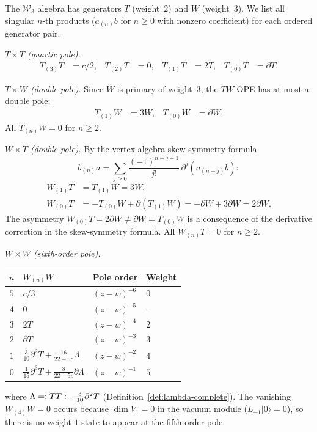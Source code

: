 \begin{computation}\label{comp:w3-nthproducts}
The $\mathcal{W}_3$ algebra has generators $T$ (weight~$2$) and $W$ (weight~$3$).
We list all singular $n$-th products ($a_{(n)}b$ for $n \geq 0$ with nonzero coefficient)
for each ordered generator pair.

\emph{$T \times T$ (quartic pole).}
\begin{align*}
T_{(3)}T &= c/2, & T_{(2)}T &= 0, &
T_{(1)}T &= 2T, & T_{(0)}T &= \partial T.
\end{align*}

\emph{$T \times W$ (double pole).}
Since $W$ is primary of weight~$3$, the $TW$ OPE has at most a double pole:
\begin{align*}
T_{(1)}W &= 3W, & T_{(0)}W &= \partial W.
\end{align*}
All $T_{(n)}W = 0$ for $n \geq 2$.

\emph{$W \times T$ (double pole).}
By the vertex algebra skew-symmetry formula
\[
b_{(n)}a = \sum_{j \geq 0}
\frac{(-1)^{n+j+1}}{j!}\,\partial^j(a_{(n+j)}b)\colon
\]
\begin{align*}
W_{(1)}T &= T_{(1)}W = 3W, \\
W_{(0)}T &= -T_{(0)}W + \partial(T_{(1)}W) = -\partial W + 3\partial W = 2\partial W.
\end{align*}
The asymmetry $W_{(0)}T = 2\partial W \neq \partial W = T_{(0)}W$ is a consequence
of the derivative correction in the skew-symmetry formula.  All $W_{(n)}T = 0$ for $n \geq 2$.

\emph{$W \times W$ (sixth-order pole).}
\begin{center}
\begin{tabular}{clll}
$n$ & $W_{(n)}W$ & Pole order & Weight \\
\hline
$5$ & $c/3$ & $(z\!-\!w)^{-6}$ & $0$ \\
$4$ & $0$ & $(z\!-\!w)^{-5}$ & -- \\
$3$ & $2T$ & $(z\!-\!w)^{-4}$ & $2$ \\
$2$ & $\partial T$ & $(z\!-\!w)^{-3}$ & $3$ \\
$1$ & $\tfrac{3}{10}\partial^2 T + \tfrac{16}{22+5c}\Lambda$ & $(z\!-\!w)^{-2}$ & $4$ \\
$0$ & $\tfrac{1}{15}\partial^3 T + \tfrac{8}{22+5c}\partial\Lambda$ & $(z\!-\!w)^{-1}$ & $5$
\end{tabular}
\end{center}
where $\Lambda = :{TT}: - \frac{3}{10}\partial^2 T$ (Definition~\ref{def:lambda-complete}).
The vanishing $W_{(4)}W = 0$ occurs because $\dim \bar{V}_1 = 0$ in the vacuum module
($L_{-1}|0\rangle = 0$), so there is no weight-$1$ state to appear at the fifth-order pole.
\end{computation}


